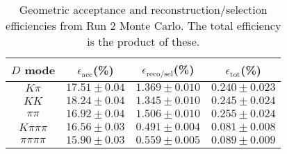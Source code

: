 \begin{table}[H]
    \centering
    \begin{tabular}{cccc}
        \toprule
        $D$ mode & $\epsilon_\mathrm{acc}$(\%) &  $\epsilon_\mathrm{reco/sel}$(\%) &  $\epsilon_\mathrm{tot}$(\%) \\
        \midrule
        $K\pi$ & $17.51 \pm 0.04$ & $1.369 \pm 0.010$ & $0.240 \pm 0.023$ \\
        $KK$ & $18.24 \pm 0.04$ & $1.345 \pm 0.010$ & $0.245 \pm 0.024$ \\
        $\pi\pi$ & $16.92 \pm 0.04$ & $1.506 \pm 0.010$ & $0.255 \pm 0.024$ \\
        $K\pi\pi\pi$ & $16.56 \pm 0.03$ & $0.491 \pm 0.004$ & $0.081 \pm 0.008$ \\
        $\pi\pi\pi\pi$ & $15.90 \pm 0.03$ & $0.559 \pm 0.005$ & $0.089 \pm 0.009$ \\
        \bottomrule
    \end{tabular}
    \caption{Geometric acceptance and reconstruction/selection efficiencies from  Run 2 Monte Carlo. The total efficiency is the  product of these.}
\label{tab:selection_efficiency_run2}
\end{table}
